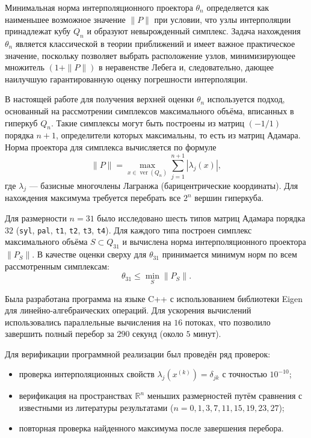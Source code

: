 \documentclass[a4paper,12pt]{article}
\theoremstyle{indented}
\begin{document}
Минимальная норма интерполяционного проектора $\theta_n$ определяется как наименьшее возможное значение $\|P\|$ при условии, что узлы интерполяции принадлежат кубу $Q_n$ и образуют невырожденный симплекс. Задача нахождения $\theta_n$ является классической в теории приближений и имеет важное практическое значение, поскольку позволяет выбрать расположение узлов, минимизирующее множитель $(1 + \|P\|)$ в неравенстве Лебега и, следовательно, дающее наилучшую гарантированную оценку погрешности интерполяции.

В настоящей работе для получения верхней оценки $\theta_n$ используется подход, основанный на рассмотрении симплексов максимального объёма, вписанных в гиперкуб $Q_n$. Такие симплексы могут быть построены из матриц $(-1/1)$ порядка $n+1$, определители которых максимальны, то есть из матриц Адамара. Норма проектора для симплекса вычисляется по формуле
\[
\|P\| = \max_{x \in \operatorname{ver}(Q_n)} \sum_{j=1}^{n+1} |\lambda_j(x)|,
\]
где $\lambda_j$ — базисные многочлены Лагранжа (барицентрические координаты). Для нахождения максимума требуется перебрать все $2^n$ вершин гиперкуба.
\par
Для размерности $n = 31$ было исследовано шесть типов матриц Адамара порядка $32$ (\texttt{syl}, \texttt{pal}, \texttt{t1}, \texttt{t2}, \texttt{t3}, \texttt{t4}). Для каждого типа построен симплекс максимального объёма $S \subset Q_{31}$ и вычислена норма интерполяционного проектора $\|P_S\|$. В качестве оценки сверху для $\theta_{31}$ принимается минимум норм по всем рассмотренным симплексам:
\[
\theta_{31} \le \min_{S} \|P_S\|.
\]
\par
Была разработана программа на языке C++ с использованием библиотеки Eigen для линейно-алгебраических операций. Для ускорения вычислений использовались параллельные вычисления на $16$ потоках, что позволило завершить полный перебор за $290$ секунд (около $5$ минут).
\par
Для верификации программной реализации был проведён ряд проверок:
\begin{itemize}
    \item проверка интерполяционных свойств $\lambda_j(x^{(k)}) = \delta_{jk}$ с точностью $10^{-10}$;
    \item верификация на пространствах $\mathbb{R}^n$ меньших размерностей путём сравнения с известными из литературы результатами ($n = 0, 1, 3, 7, 11, 15, 19, 23, 27$);
    \item повторная проверка найденного максимума после завершения перебора.
\end{itemize}
\end{document}
